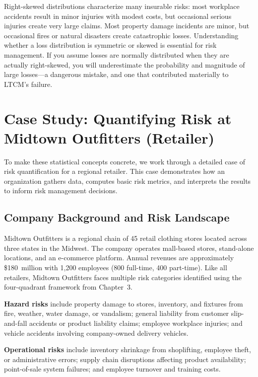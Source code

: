 \documentclass[11pt,openany]{book}
\begin{document}
Right-skewed distributions characterize many insurable risks: most workplace
accidents result in minor injuries with modest costs, but occasional serious
injuries create very large claims. Most property damage incidents are minor, but
occasional fires or natural disasters create catastrophic losses. Understanding
whether a loss distribution is symmetric or skewed is essential for risk
management. If you assume losses are normally distributed when they are actually
right-skewed, you will underestimate the probability and magnitude of large
losses---a dangerous mistake, and one that contributed materially to LTCM's
failure.

\section{Case Study: Quantifying Risk at Midtown Outfitters (Retailer)}
\label{sec:midtown-outfitters}

To make these statistical concepts concrete, we work through a detailed case
of risk quantification for a regional retailer. This case demonstrates how an
organization gathers data, computes basic risk metrics, and interprets the
results to inform risk management decisions.

\subsection{Company Background and Risk Landscape}
\label{subsec:midtown-background}

Midtown Outfitters is a regional chain of 45 retail clothing stores located
across three states in the Midwest. The company operates mall-based stores,
stand-alone locations, and an e-commerce platform. Annual revenues are
approximately \$180~million with 1,200 employees (800 full-time, 400
part-time). Like all retailers, Midtown Outfitters faces multiple risk
categories identified using the four-quadrant framework from Chapter~3.

\textbf{Hazard risks} include property damage to stores, inventory, and
fixtures from fire, weather, water damage, or vandalism; general liability from
customer slip-and-fall accidents or product liability claims; employee workplace
injuries; and vehicle accidents involving company-owned delivery vehicles.

\textbf{Operational risks} include inventory shrinkage from shoplifting,
employee theft, or administrative errors; supply chain disruptions affecting
product availability; point-of-sale system failures; and employee turnover and
training costs.
\end{document}
